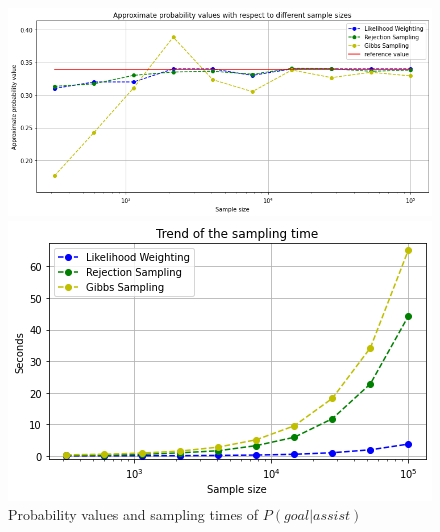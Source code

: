 \documentclass[a4paper,10pt]{report}
\begin{document}
    \begin{figure}[h]
      \centering\begin{minipage}[b]{0.45\textwidth}
        \includegraphics[width=\textwidth]{assets/img/query1prob.png}
      \end{minipage}
      \hfill\begin{minipage}[b]{0.45\textwidth}
        \includegraphics[width=\textwidth]{assets/img/query1time.png}
      \end{minipage}
    \caption{Probability values and sampling times of $P(goal|assist )$}
    \label{fig:query1results}
    \end{figure}
    
\end{document}
